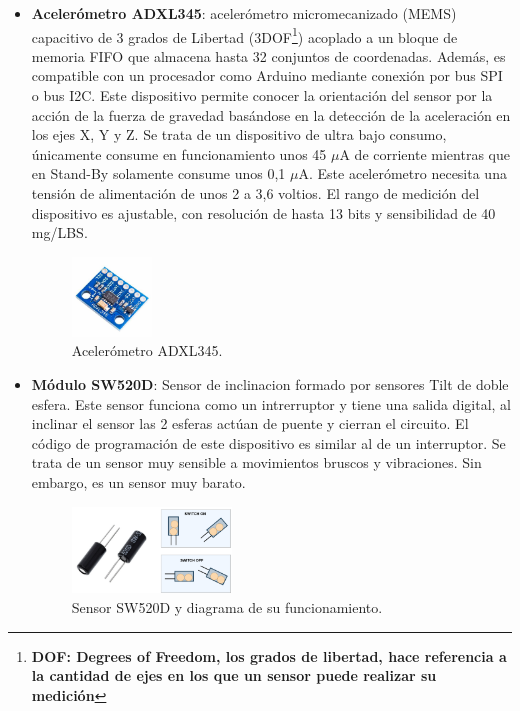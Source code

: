 \begin{itemize}
    \item \textbf{Acelerómetro ADXL345}\cite{ADXL345}: acelerómetro micromecanizado (MEMS) capacitivo de 3 grados de Libertad (3DOF\footnote{\textbf{DOF: Degrees of Freedom, los grados de libertad, hace referencia a la cantidad de ejes en los que un sensor puede realizar su medición}}) acoplado a un bloque de memoria FIFO que almacena hasta 32 conjuntos de coordenadas. Además, es compatible con un procesador como Arduino mediante conexión por bus SPI o bus I2C. Este dispositivo permite conocer la orientación del sensor por la acción de la fuerza de gravedad basándose en la detección de la aceleración en los ejes X, Y y Z. Se trata de un dispositivo de ultra bajo consumo, únicamente consume en funcionamiento unos 45 $\mu$A de corriente mientras que en Stand-By solamente consume unos 0,1 $\mu$A. Este acelerómetro necesita una tensión de alimentación de unos 2 a 3,6 voltios. El rango de medición del dispositivo es ajustable, con resolución de hasta 13 bits y sensibilidad de 40 mg/LBS.
\begin{figure}[h!]
    \centering
    \includegraphics[width=0.2\textwidth]{img/ADXL345.jpeg}
    \caption{Acelerómetro ADXL345\cite{imgADXL345}.}
    \label{fig:ADXL345} %
\end{figure}

    \item \textbf{Módulo SW520D}\cite{SW520D_1}: Sensor de inclinacion formado por sensores Tilt de doble esfera. Este sensor funciona como un intrerruptor y tiene una salida digital, al inclinar el sensor las 2 esferas actúan de puente y cierran el circuito. El código de programación de este dispositivo es similar al de un interruptor. Se trata de un sensor muy sensible a movimientos bruscos y vibraciones. Sin embargo, es un sensor muy barato.
\begin{figure}[h!]
    \centering
    \includegraphics[width=0.4\textwidth]{img/imgSW520D_diag.png}
    \caption{Sensor SW520D\cite{imgSW520D} y diagrama de su funcionamiento.}
    \label{fig:imgSW520D} %
\end{figure}


\end{itemize}
